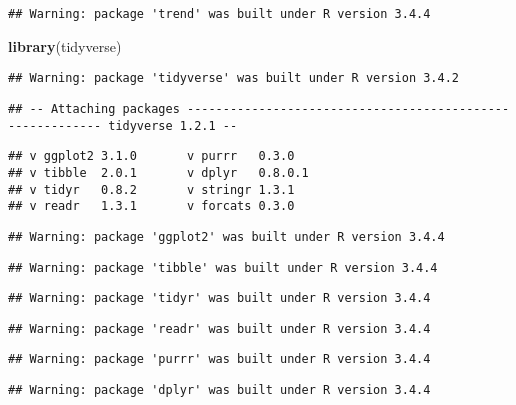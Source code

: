 \documentclass[]{article}
\newenvironment{Shaded}{\begin{snugshade}}{\end{snugshade}}
\newcommand{\KeywordTok}[1]{\textcolor[rgb]{0.13,0.29,0.53}{\textbf{#1}}}
\newcommand{\NormalTok}[1]{#1}
\begin{document}
\begin{verbatim}
## Warning: package 'trend' was built under R version 3.4.4
\end{verbatim}

\begin{Shaded}
\begin{Highlighting}[]
\KeywordTok{library}\NormalTok{(tidyverse)}
\end{Highlighting}
\end{Shaded}

\begin{verbatim}
## Warning: package 'tidyverse' was built under R version 3.4.2
\end{verbatim}

\begin{verbatim}
## -- Attaching packages ---------------------------------------------------------- tidyverse 1.2.1 --
\end{verbatim}

\begin{verbatim}
## v ggplot2 3.1.0       v purrr   0.3.0  
## v tibble  2.0.1       v dplyr   0.8.0.1
## v tidyr   0.8.2       v stringr 1.3.1  
## v readr   1.3.1       v forcats 0.3.0
\end{verbatim}

\begin{verbatim}
## Warning: package 'ggplot2' was built under R version 3.4.4
\end{verbatim}

\begin{verbatim}
## Warning: package 'tibble' was built under R version 3.4.4
\end{verbatim}

\begin{verbatim}
## Warning: package 'tidyr' was built under R version 3.4.4
\end{verbatim}

\begin{verbatim}
## Warning: package 'readr' was built under R version 3.4.4
\end{verbatim}

\begin{verbatim}
## Warning: package 'purrr' was built under R version 3.4.4
\end{verbatim}

\begin{verbatim}
## Warning: package 'dplyr' was built under R version 3.4.4
\end{verbatim}
\end{document}
